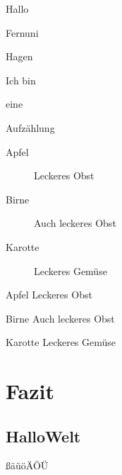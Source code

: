 \documentclass[12pt,ngerman,parskip=full]{scrreprt}
\begin{document}
\begin{compactenum}
	\item Hallo 
	\item Fernuni
	\item Hagen
	\item Ich bin
	\item eine 
	\item Aufzählung
\end{compactenum}

\begin{description}
\item[Apfel] Leckeres Obst
\item[Birne] Auch leckeres Obst
\item[Karotte] Leckeres Gemüse
\end{description}

\begin{compactdesc}
\item[Apfel] Leckeres Obst
\item[Birne] Auch leckeres Obst
\item[Karotte] Leckeres Gemüse
\end{compactdesc}


\chapter{Fazit}\label{cha:fazit}

\section{HalloWelt}\label{sec:hallo}

ßäüöÄÖÜ

\blindtext[2]  

\blindtext[2]  

\blindtext[2]  
\end{document}

